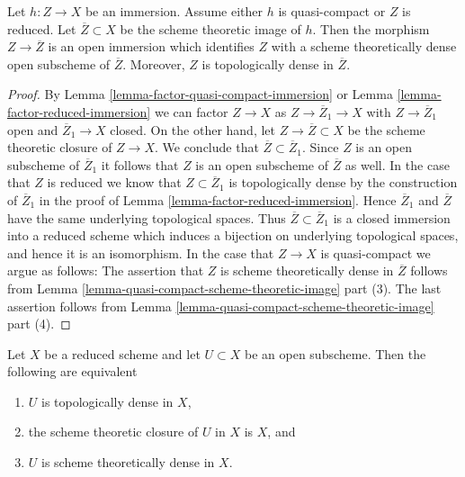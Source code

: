\begin{lemma}
\label{lemma-quasi-compact-immersion}
Let $h : Z \to X$ be an immersion. Assume either $h$ is quasi-compact
or $Z$ is reduced. Let $\overline{Z} \subset X$ be the scheme theoretic
image of $h$. Then the morphism $Z \to \overline{Z}$ is an open immersion
which identifies $Z$ with a scheme theoretically dense open
subscheme of $\overline{Z}$. Moreover, $Z$ is topologically
dense in $\overline{Z}$.
\end{lemma}

\begin{proof}
By Lemma \ref{lemma-factor-quasi-compact-immersion} or
Lemma \ref{lemma-factor-reduced-immersion} we can factor
$Z \to X$ as $Z \to \overline{Z}_1 \to X$ with $Z \to \overline{Z}_1$
open and $\overline{Z}_1 \to X$ closed. On the other hand, let
$Z \to \overline{Z} \subset X$ be the scheme theoretic closure of
$Z \to X$. We conclude that $\overline{Z} \subset \overline{Z}_1$.
Since $Z$ is an open subscheme of $\overline{Z}_1$ it follows
that $Z$ is an open subscheme of $\overline{Z}$ as well.
In the case that $Z$ is reduced we know that $Z \subset \overline{Z}_1$
is topologically dense by the construction of $\overline{Z}_1$ in
the proof of Lemma \ref{lemma-factor-reduced-immersion}.
Hence $\overline{Z}_1$ and $\overline{Z}$ have the same
underlying topological spaces. Thus $\overline{Z} \subset \overline{Z}_1$
is a closed immersion into a reduced scheme which induces a bijection
on underlying topological spaces, and hence it is an isomorphism.
In the case that $Z \to X$ is quasi-compact we argue as follows:
The assertion that $Z$ is scheme theoretically dense in
$\overline{Z}$ follows from
Lemma \ref{lemma-quasi-compact-scheme-theoretic-image} part (3).
The last assertion follows from
Lemma \ref{lemma-quasi-compact-scheme-theoretic-image} part (4).
\end{proof}

\begin{lemma}
\label{lemma-reduced-scheme-theoretically-dense}
Let $X$ be a reduced scheme and let $U \subset X$ be an open subscheme.
Then the following are equivalent
\begin{enumerate}
\item $U$ is topologically dense in $X$,
\item the scheme theoretic closure of $U$ in $X$ is $X$, and
\item $U$ is scheme theoretically dense in $X$.
\end{enumerate}
\end{lemma}

